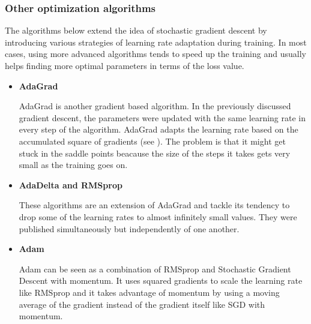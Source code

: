\newpage
\subsubsection{Other optimization algorithms}

The algorithms below extend the idea of stochastic gradient descent by introducing various strategies of learning rate adaptation during training. In most cases, using more advanced algorithms tends to speed up the training and usually helps finding more optimal parameters in terms of the loss value. 

\begin{itemize}
	\item \textbf{AdaGrad}
	
	AdaGrad is another gradient based algorithm. In the previously discussed gradient descent, the parameters were updated with the same learning rate in every step of the algorithm. AdaGrad adapts the learning rate based on the accumulated square of gradients (see \cite{stanford-L7}). The problem is that it might get stuck in the saddle points beacause the size of the steps it takes gets very small as the training goes on. \cite{stanford-L7}
	
	\item \textbf{AdaDelta and RMSprop}
	
	These algorithms are an extension of AdaGrad and tackle its tendency to drop some of the learning rates to almost infinitely small values. They were published simultaneously but independently of one another. \cite{groman}
	
	\item \textbf{Adam}
	
	Adam can be seen as a combination of RMSprop and Stochastic Gradient Descent with momentum. It uses squared gradients to scale the learning rate like RMSprop and it takes advantage of momentum by using a moving average of the gradient instead of the gradient itself like SGD with momentum. \cite{bushaev} \cite{groman}

\end{itemize}

